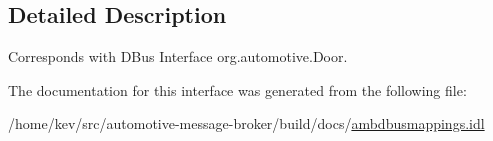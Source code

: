 \subsection{Detailed Description}
Corresponds with D\+Bus Interface org.\+automotive.\+Door. 

The documentation for this interface was generated from the following file\+:\begin{DoxyCompactItemize}
\item 
/home/kev/src/automotive-\/message-\/broker/build/docs/\hyperlink{ambdbusmappings_8idl}{ambdbusmappings.\+idl}\end{DoxyCompactItemize}
